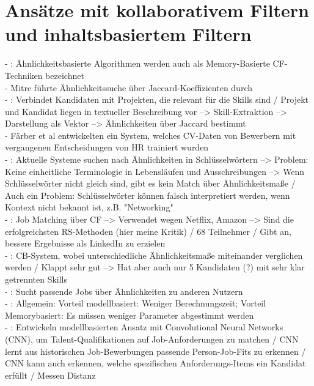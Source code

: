\section{Ansätze mit kollaborativem Filtern und inhaltsbasiertem Filtern}
\label{ch:standDerForschung:cfundcb}
- \cite{weightedSimilarity:2015}: Ähnlichkeitsbasierte Algorithmen werden auch als Memory-Basierte CF-Techniken bezeichnet\\
- Mitre führte Ähnlichkeitssuche über Jaccard-Koeffizienten durch \cite{mitre:2014} \\
- \cite{buildingVectorRepresentations:2020}: Verbindet Kandidaten mit Projekten, die relevant für die Skills sind / Projekt und Kandidat liegen in textueller Beschreibung vor --> Skill-Extraktion --> Darstellung als Vektor --> Ähnlichkeiten über Jaccard bestimmt \\
- \cite{malinowski:2008} Färber et al entwickelten ein System, welches CV-Daten von Bewerbern mit vergangenen Entscheidungen von HR trainiert wurden \\
- \cite{comibingCareer:2013}: Aktuelle Systeme suchen nach Ähnlichkeiten in Schlüsselwörtern --> Problem: Keine einheitliche Terminologie in Lebensläufen und Ausschreibungen --> Wenn Schlüsselwörter nicht gleich sind, gibt es kein Match über Ähnlichkeitsmaße / Auch ein Problem: Schlüsselwörter können falsch interpretiert werden, wenn Kontext nicht bekannt ist, z.B. "Networking"\\
- \cite{jobMatcher:2020}: Job Matching über CF --> Verwendet wegen Netflix, Amazon --> Sind die erfolgreichsten RS-Methoden (hier meine Kritik) / 68 Teilnehmer / Gibt an, bessere Ergebnisse als LinkedIn zu erzielen \\
- \cite{enhancingERecruitment:2012}: CB-System, wobei unterschiedliche Ähnlichkeitsmaße miteinander verglichen werden / Klappt sehr gut --> Hat aber auch nur 5 Kandidaten (?) mit sehr klar getrennten Skills \\
- \cite{dynamicUserProfile:2013}: Sucht passende Jobs über Ähnlichkeiten zu anderen Nutzern \\
- \cite{weightedSimilarity:2015}: Allgemein: Vorteil modellbasiert: Weniger Berechnungszeit; Vorteil Memorybasiert: Es müssen weniger Parameter abgestimmt werden \\
- \cite{personJobFit:2018}: Entwickeln modellbasierten Ansatz mit Convolutional Neural Networks (CNN), um Talent-Qualifikationen auf Job-Anforderungen zu matchen / CNN lernt aus historischen Job-Bewerbungen passende Person-Job-Fits zu erkennen / CNN kann auch erkennen, welche spezifischen Anforderungs-Items ein Kandidat erfüllt / Messen Distanz

